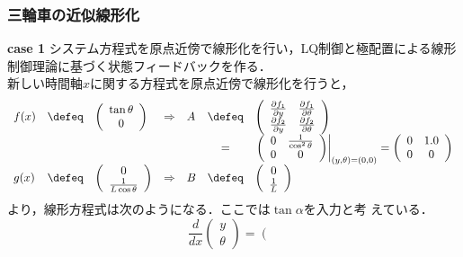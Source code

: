 \begin{frame}[t] 
\frametitle{三輪車の近似線形化}


\noindent
{\bf case 1} 
       システム方程式を原点近傍で線形化を行い，LQ制御と極配置による線形
       制御理論に基づく状態フィードバックを作る． \\
       新しい時間軸$x$に関する方程式を原点近傍で線形化を行うと，
\begin{equation*}
\begin{array}{lclclcl}
 f(x) &\defeq&
 \left(
 \begin{array}{c}
  \tan \theta \\
  0
 \end{array}
 \right) &\Rightarrow&
 A &\defeq&
 \left(
 \begin{array}{cc}
  \frac{\partial f_1}{\partial y} & \frac{\partial f_1}{\partial \theta} \\
  \frac{\partial f_2}{\partial y} & \frac{\partial f_2}{\partial \theta} 
 \end{array}
 \right) \\
 & & & & &=&
 \left. \left(
 \begin{array}{cc}
  0 & \frac{1}{\cos ^2 \theta} \\
  0 & 0
 \end{array}
 \right) \right|_{(y,\theta) = (0, 0)} =
 \left(
 \begin{array}{cc}
  0 & 1.0 \\
  0 & 0
 \end{array}
 \right) \\
 g(x) &\defeq&
 \left(
 \begin{array}{c}
  0 \\
  \frac{1}{L \cos \theta}
 \end{array}
 \right) &\Rightarrow&
 B &\defeq&
 \left(
 \begin{array}{c}
  0 \\
  \frac{1}{L}
 \end{array}
 \right)
\end{array}
\end{equation*}
       より，線形方程式は次のようになる．ここでは$\tan \alpha$を入力と考
       えている．
\begin{equation}
 \frac{d}{dx}\left(\begin{array}{c}
     y \\
     \theta 
   \end{array} \right) = \left(\begin{array}{cc}

\end{array}
\end{equation}
\end{frame}
